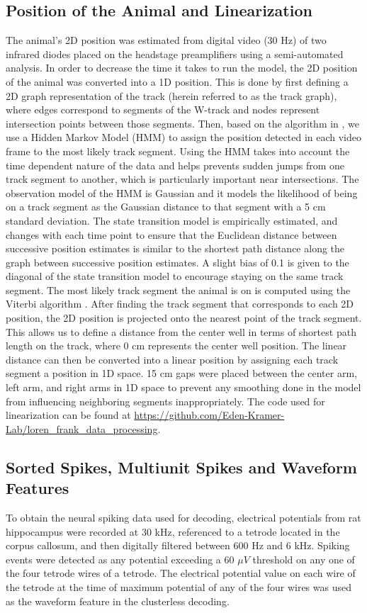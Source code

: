 \documentclass[times, twoside]{zHenriquesLab-StyleBioRxiv}
\begin{document}
\subsection*{Position of the Animal and Linearization}
The animal's 2D position was estimated from digital video (30 Hz) of two infrared diodes placed on the headstage preamplifiers using a semi-automated analysis. In order to decrease the time it takes to run the model, the 2D position of the animal was converted into a 1D position. This is done by first defining a 2D graph representation of the track (herein referred to as the track graph), where edges correspond to segments of the W-track and nodes represent intersection points between those segments. Then, based on the algorithm in \cite{NewsonHiddenMarkovmap2009}, we use a Hidden Markov Model (HMM) to assign the position detected in each video frame to the most likely track segment. Using the HMM takes into account the time dependent nature of the data and helps prevents sudden jumps from one track segment to another, which is particularly important near intersections. The observation model of the HMM is Gaussian and it models the likelihood of being on a track segment as the Gaussian distance to that segment with a 5 cm standard deviation. The state transition model is empirically estimated, and changes with each time point to ensure that the Euclidean distance between successive position estimates is similar to the shortest path distance along the graph between successive position estimates. A slight bias of 0.1 is given to the diagonal of the state transition model to encourage staying on the same track segment. The most likely track segment the animal is on is computed using the Viterbi algorithm \cite{ViterbiErrorboundsconvolutional1967}. After finding the track segment that corresponds to each 2D position, the 2D position is projected onto the nearest point of the track segment. This allows us to define a distance from the center well in terms of shortest path length on the track, where 0 cm represents the center well position. The linear distance can then be converted into a linear position by assigning each track segment a position in 1D space. 15 cm gaps were placed between the center arm, left arm, and right arms in 1D space to prevent any smoothing done in the model from influencing neighboring segments inappropriately. The code used for linearization can be found at \url{https://github.com/Eden-Kramer-Lab/loren_frank_data_processing}.

\subsection*{Sorted Spikes, Multiunit Spikes and Waveform Features}
To obtain the neural spiking data used for decoding, electrical potentials from rat hippocampus were recorded at 30 kHz, referenced to a tetrode located in the corpus callosum, and then digitally filtered between 600 Hz and 6 kHz. Spiking events were detected as any potential exceeding a 60 $\mu V$ threshold on any one of the four tetrode wires of a tetrode. The electrical potential value on each wire of the tetrode at the time of maximum potential of any of the four wires was used as the waveform feature in the clusterless decoding.
\end{document}
